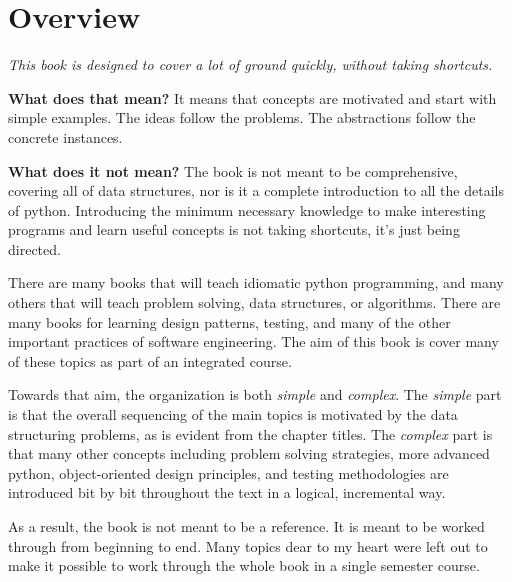 \chapter{Overview}


\emph{This book is designed to cover a lot of ground quickly, without taking shortcuts.}


\textbf{What does that mean?}
It means that concepts are motivated and start with simple examples.
The ideas follow the problems.
The abstractions follow the concrete instances.


\textbf{What does it not mean?}
The book is not meant to be comprehensive, covering all of data structures,
nor is it a complete introduction to all the details of python.
Introducing the minimum necessary knowledge to make interesting programs and learn useful concepts is not taking shortcuts, it's just being directed.


There are many books that will teach idiomatic python programming, and many others that will teach problem solving, data structures, or algorithms.
There are many books for learning design patterns, testing, and many of the other important practices of software engineering.
The aim of this book is cover many of these topics as part of an integrated course.


Towards that aim, the organization is both \emph{simple} and \emph{complex}.
The \emph{simple} part is that the overall sequencing of the main topics is motivated by the data structuring problems, as is evident from the chapter titles.
The \emph{complex} part is that many other concepts including problem solving strategies, more advanced python, object-oriented design principles, and testing methodologies are introduced bit by bit throughout the text in a logical, incremental way.


As a result, the book is not meant to be a reference.
It is meant to be worked through from beginning to end.
Many topics dear to my heart were left out to make it possible to work through the whole book in a single semester course.
